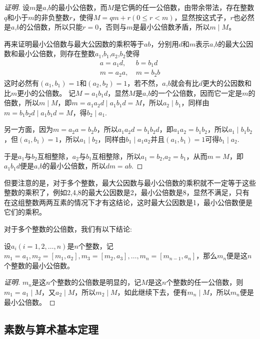 \begin{proof}[证明]
  设$m$是$a$,$b$的最小公倍数，而$M$是它俩的任一公倍数，由带余带法，存在整数$q$和小于$m$的非负整数$r$，使得$M=qm+r(0 \leqslant r <m)$，显然按这式子，$r$也必然是$a$,$b$的公倍数，所以只能$r=0$，否则与$m$是最小公倍数矛盾，所以$m\mid M$。

  再来证明最小公倍数与最大公因数的乘积等于$ab$，分别用$d$和$m$表示$a$,$b$的最大公因数和最小公倍数，则存在整数$a_1$,$b_1$,$a_2$,$b_2$使得
  \begin{align*}
    a = a_1d, & \  b = b_1d \\
    m = a_2a, & \  m = b_2b
  \end{align*}
  这时必然有$(a_1,b_1)=1$和$(a_2,b_2)=1$，若不然，$a$,$b$就会有比$d$更大的公因数和比$m$更小的公倍数。
  记$M=a_1b_1d$，显然$M$是$a$,$b$的一个公倍数，因而它一定是$m$的倍数，所以$m \mid M$，即$m=a_1a_2d \mid a_1b_1d = M$，所以$a_2 \mid b_1$，同样由$m=b_1b_2d \mid a_1b_1d = M$，得$b_2 \mid a_1$.

  另一方面，因为$m=a_2a=b_2b$，所以$a_1a_2d=b_1b_2d$，即$a_1a_2=b_1b_2$，所以$a_1 \mid b_1b_2$，但$(a_1,b_1)=1$，所以$a_1 \mid b_2$，同样由$b_1 \mid a_1a_2$并且$(a_1,b_1)=1$可得$b_1 \mid a_2$.

  于是$a_1$与$b_2$互相整除，$a_2$与$b_1$互相整除，所以$a_1=b_2$,$a_2=b_1$，从而$m=M$，即$a_1b_1d$便是$a$,$b$的最小公倍数，所以$dm=ab$.
\end{proof}

但要注意的是，对于多个整数，最大公因数与最小公倍数的乘积就不一定等于这些整数的乘积了，例如2,4,8的最大公因数是2，最小公倍数是8，显然不满足，只有在这组整数两两互素的情况下才有这结论，这时最大公因数是1，最小公倍数便是它们的乘积。

对于多个整数的公倍数，我们有以下结论:
\begin{theorem}
  设$a_i(i=1,2,\ldots,n)$是$n$个整数，记$m_1=a_1, m_2=[m_1,a_2], m_3=[m_2,a_3],\ldots,m_n=[m_{n-1},a_n]$，那么$m_n$便是这$n$个整数的最小公倍数。
\end{theorem}

\begin{proof}[证明]
  $m_n$是这$n$个整数的公倍数是明显的，记$M$是这$n$个整数的任一公倍数，则$m_1 = a_1 \mid M$，又$a_2 \mid M$，所以$m_2 \mid M$，如此继续下去，便有$m_n \mid M$，所以$m_n$便是最小公倍数。
\end{proof}

\subsection{素数与算术基本定理}
\label{sec:prime-number-and-fundamental-theorem-of-arithmetic}

